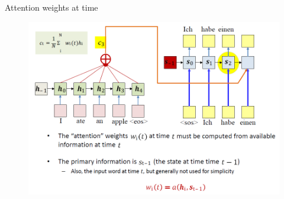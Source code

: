 \begin{frame}{Attention weights at time}
    \begin{figure}
        \centering
        \includegraphics[width=\textwidth]{images/attention/attention-2.png}
    \end{figure}
\end{frame}

